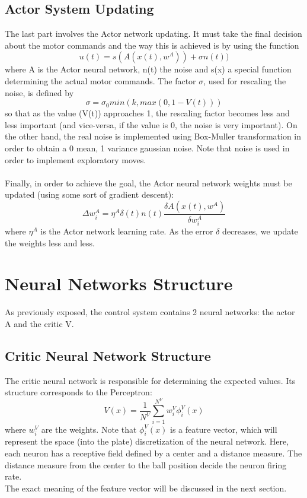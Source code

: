 \documentclass{article}
\begin{document}
\subsection{Actor System Updating}
The last part involves the Actor network updating. It must take the final decision about the motor commands and the way this is achieved is by using the function
\[
u(t) = s(A(x(t), w^{A})) + \sigma n(t))
\]
where A is the Actor neural network, n(t) the noise and s(x) a special function determining the actual motor commands. The factor \(\sigma\), used for rescaling the noise, is defined by
\[
\sigma = \sigma_{0} min(k, max(0, 1 - V(t)))
\]
so that as the value (V(t)) approaches 1, the rescaling factor becomes less and less important (and vice-versa, if the value is 0, the noise is very important). On the other hand, the real noise is implemented using Box-Muller transformation in order to obtain a 0 mean, 1 variance gaussian noise. Note that noise is used in order to implement exploratory moves. \\ \\


Finally, in order to achieve the goal, the Actor neural network weights must be updated (using some sort of gradient descent):  
\[
\Delta w_{i}^{A} = \eta^{A}\delta (t)n(t)\frac{\delta A(x(t), w^{A})}{\delta w_{i}^{A}}
\]
where \(\eta^{A}\) is the Actor network learning rate. As the error \(\delta\) decreases, we update the weights less and less. \\



\section{Neural Networks Structure}
As previously exposed, the control system contains 2 neural networks: the actor A and the critic V.

\subsection{Critic Neural Network Structure}
The critic neural network is responsible for determining the expected values. Its structure corresponds to the Perceptron:
\[
V(x) = \frac{1}{N^{V}} \sum_{i=1}^{N^{V}}{w_{i}^{V}\phi_{i}^{V}(x)}
\]
where \(w_{i}^{V}\) are the weights. Note that \(\phi_{i}^{V}(x)\) is a feature vector, which will represent the space (into the plate) discretization of the neural network. Here, each neuron has a receptive field defined by a center and a distance measure. The distance measure from the center to the ball position decide the neuron firing rate.\\
The exact meaning of the feature vector will be discussed in the next section.
\end{document}
